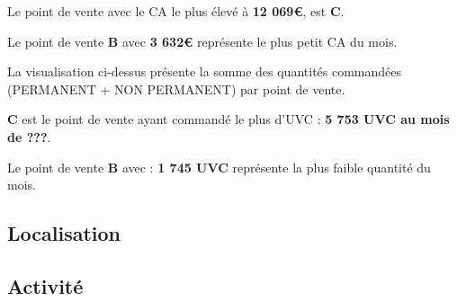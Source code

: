 \documentclass{beamer}
\begin{document}
\begin{frame}
        Le point de vente avec le CA le plus élevé à \textbf{12 069€}, est \textbf{C}.\par
        Le point de vente \textbf{B} avec \textbf{3 632€} représente le plus petit CA du mois.\par
        La visualisation ci-dessus présente la somme des quantités commandées (PERMANENT + NON PERMANENT) par point de vente.\par
        \textbf{C} est le point de vente ayant commandé le plus d’UVC : \textbf{5 753 UVC au mois de ???}.\par
        Le point de vente \textbf{B} avec : \textbf{1 745 UVC} représente la plus faible quantité du mois.\par
    \end{frame}

    \subsection{Localisation}
    \subsection{Activité}
\end{document}
